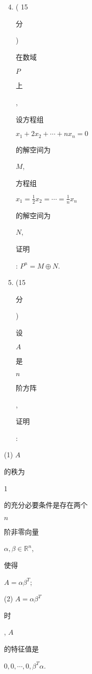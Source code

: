 \documentclass[10pt]{article}
\begin{document}
\begin{enumerate}
  \setcounter{enumi}{3}
  \item ( 15 \begin{CJK}{UTF8}{mj}分\end{CJK}) \begin{CJK}{UTF8}{mj}在数域\end{CJK} $P$ \begin{CJK}{UTF8}{mj}上\end{CJK}, \begin{CJK}{UTF8}{mj}设方程组\end{CJK} $x_{1}+2 x_{2}+\cdots+n x_{n}=0$ \begin{CJK}{UTF8}{mj}的解空间为\end{CJK} $M$, \begin{CJK}{UTF8}{mj}方程组\end{CJK} $x_{1}=\frac{1}{2} x_{2}=\cdots=\frac{1}{n} x_{n}$ \begin{CJK}{UTF8}{mj}的解空间为\end{CJK} $N$, \begin{CJK}{UTF8}{mj}证明\end{CJK}: $P^{n}=M \oplus N$.

  \item (15 \begin{CJK}{UTF8}{mj}分\end{CJK}) \begin{CJK}{UTF8}{mj}设\end{CJK} $A$ \begin{CJK}{UTF8}{mj}是\end{CJK} $n$ \begin{CJK}{UTF8}{mj}阶方阵\end{CJK}, \begin{CJK}{UTF8}{mj}证明\end{CJK}:

\end{enumerate}
(1) $A$ \begin{CJK}{UTF8}{mj}的秩为\end{CJK} 1 \begin{CJK}{UTF8}{mj}的充分必要条件是存在两个\end{CJK} $n$ \begin{CJK}{UTF8}{mj}阶非零向量\end{CJK} $\alpha, \beta \in \mathbb{R}^{n}$, \begin{CJK}{UTF8}{mj}使得\end{CJK} $A=\alpha \beta^{T}$;

(2) $A=\alpha \beta^{T}$ \begin{CJK}{UTF8}{mj}时\end{CJK}, $A$ \begin{CJK}{UTF8}{mj}的特征值是\end{CJK} $0,0, \cdots, 0, \beta^{T} \alpha$.
\end{document}
